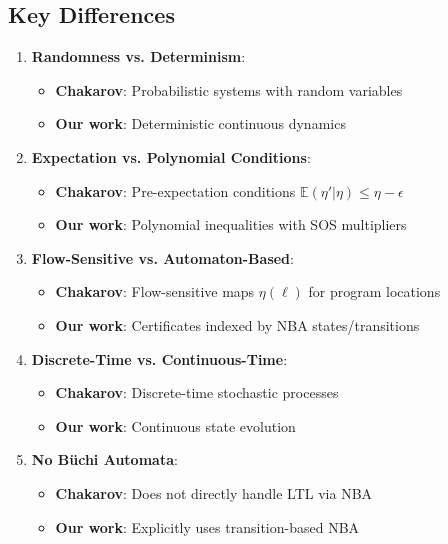 \documentclass{article}
\begin{document}
\subsection{Key Differences}

\begin{enumerate}
    \item \textbf{Randomness vs. Determinism}:
    \begin{itemize}
        \item \textbf{Chakarov}: Probabilistic systems with random variables
        \item \textbf{Our work}: Deterministic continuous dynamics
    \end{itemize}

    \item \textbf{Expectation vs. Polynomial Conditions}:
    \begin{itemize}
        \item \textbf{Chakarov}: Pre-expectation conditions $\mathbb{E}(\eta' | \eta) \leq \eta - \epsilon$
        \item \textbf{Our work}: Polynomial inequalities with SOS multipliers
    \end{itemize}

    \item \textbf{Flow-Sensitive vs. Automaton-Based}:
    \begin{itemize}
        \item \textbf{Chakarov}: Flow-sensitive maps $\eta(\ell)$ for program locations
        \item \textbf{Our work}: Certificates indexed by NBA states/transitions
    \end{itemize}

    \item \textbf{Discrete-Time vs. Continuous-Time}:
    \begin{itemize}
        \item \textbf{Chakarov}: Discrete-time stochastic processes
        \item \textbf{Our work}: Continuous state evolution
    \end{itemize}

    \item \textbf{No Büchi Automata}:
    \begin{itemize}
        \item \textbf{Chakarov}: Does not directly handle LTL via NBA
        \item \textbf{Our work}: Explicitly uses transition-based NBA
    \end{itemize}
\end{enumerate}
\end{document}
